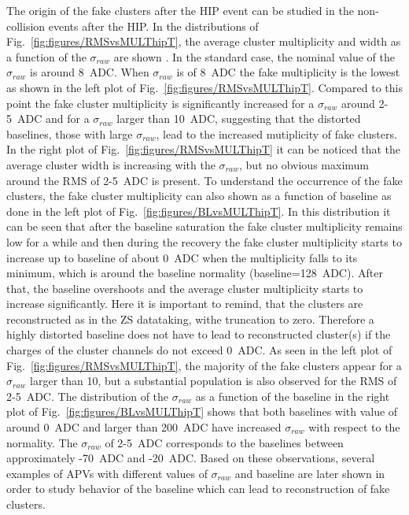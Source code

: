 The origin of the fake clusters after the HIP event can be studied in the non-collision events after the HIP. In the distributions of Fig.~\ref{fig:figures/RMSvsMULThipT}, the average cluster multiplicity and width as a function of the $\sigma_{raw}$ are shown . In the standard case, the nominal value of the $\sigma_{raw}$ is around 8~ADC. When $\sigma_{raw}$ is of 8~ADC the fake multiplicity is the lowest as shown in the left plot of Fig.~\ref{fig:figures/RMSvsMULThipT}. Compared to this point the fake cluster multiplicity is significantly increased for a $\sigma_{raw}$  around 2-5~ADC and for a $\sigma_{raw}$ larger than 10~ADC, suggesting that the distorted baselines, those with large $\sigma_{raw}$, lead to the increased mutiplicity of fake clusters. In the right plot of Fig.~\ref{fig:figures/RMSvsMULThipT} it can be noticed that the average cluster width is increasing with the $\sigma_{raw}$, but no obvious maximum around the RMS of 2-5~ADC is present. To understand the occurrence of the fake clusters, the fake cluster multiplicity can also shown as a function of baseline as done in the left plot of Fig.~\ref{fig:figures/BLvsMULThipT}. In this distribution it can be seen that after the baseline saturation the fake cluster multiplicity remains low for a while and then during the recovery the fake cluster multiplicity starts to increase up to baseline of about 0~ADC when the multiplicity falls to its minimum, which is around the baseline normality (baseline=128~ADC). After that, the baseline overshoots and the average cluster multiplicity starts to increase significantly. Here it is important to remind, that the clusters are reconstructed as in the ZS datataking, withe truncation to zero. Therefore a highly distorted baseline does not have to lead to reconstructed cluster(s) if the charges of the cluster channels do not exceed 0~ADC.  As seen in the left plot of Fig.~\ref{fig:figures/RMSvsMULThipT}, the majority of the fake clusters appear for a $\sigma_{raw}$ larger than 10, but a substantial population is also observed for the RMS of 2-5~ADC. The distribution of the $\sigma_{raw}$ as a function of the baseline in the right plot of Fig.~\ref{fig:figures/BLvsMULThipT} shows that both baselines with value of around 0~ADC and larger than 200~ADC have increased $\sigma_{raw}$ with respect to the normality. The $\sigma_{raw}$ of 2-5~ADC corresponds to the baselines between approximately -70~ADC and -20~ADC. Based on these observations, several examples of APVs with different values of $\sigma_{raw}$ and baseline are later shown in order to study behavior of the baseline which can lead to reconstruction of fake clusters.

